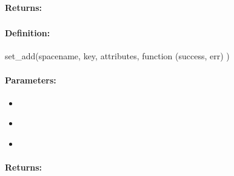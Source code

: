 \paragraph{Returns:}


\pagebreak
\subsubsection{}
\label{api:nodejs:set_add}


\paragraph{Definition:}
\begin{javascriptcode}
set_add(spacename, key, attributes, function (success, err) {})
\end{javascriptcode}
\paragraph{Parameters:}
\begin{itemize}[noitemsep]
\item {}\\

\item {}\\

\item {}\\

\end{itemize}

\paragraph{Returns:}


\pagebreak
\subsubsection{}
\label{api:nodejs:cond_set_add}


